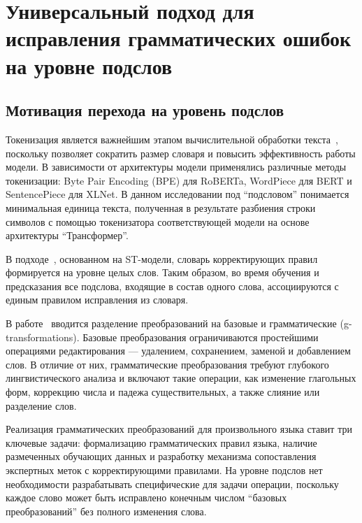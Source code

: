 \newpage

\section{Универсальный подход для исправления грамматических ошибок на уровне подслов}
\subsection{Мотивация перехода на уровень подслов}

Токенизация является важнейшим этапом вычислительной обработки текста~\cite{b29,b30}, поскольку позволяет сократить размер словаря и повысить эффективность работы модели. В зависимости от архитектуры модели применялись различные методы токенизации: Byte Pair Encoding (BPE) для RoBERTa, WordPiece для BERT и SentencePiece для XLNet. В данном исследовании под “подсловом” понимается минимальная единица текста, полученная в результате разбиения строки символов с помощью токенизатора соответствующей модели на основе архитектуры “Трансформер”.

В подходе~\cite{b15}, основанном на ST-модели, словарь корректирующих правил формируется на уровне целых слов. Таким образом, во время обучения и предсказания все подслова, входящие в состав одного слова, ассоциируются с единым правилом исправления из словаря.

В работе~\cite{b15} вводится разделение преобразований на базовые и грамматические (g-transformations). Базовые преобразования ограничиваются простейшими операциями редактирования --- удалением, сохранением, заменой и добавлением слов. В отличие от них, грамматические преобразования требуют глубокого лингвистического анализа и включают такие операции, как изменение глагольных форм, коррекцию числа и падежа существительных, а также слияние или разделение слов.

Реализация грамматических преобразований для произвольного языка ставит три ключевые задачи: формализацию грамматических правил языка, наличие размеченных обучающих данных и разработку механизма сопоставления экспертных меток с корректирующими правилами. На уровне подслов нет необходимости разрабатывать специфические для задачи операции, поскольку каждое слово может быть исправлено конечным числом “базовых преобразований” без полного изменения слова.


